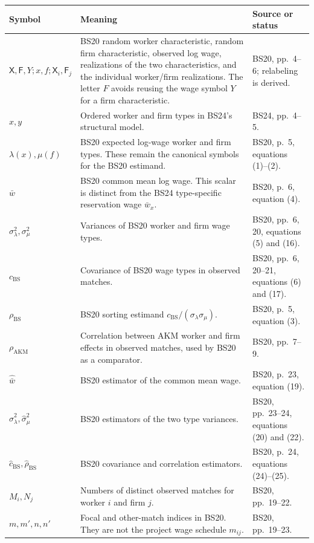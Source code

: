 \documentclass[11pt]{article}
\begin{document}
\begin{longtable}{p{}p{}p{}}
\textbf{Symbol} & \textbf{Meaning} & \textbf{Source or status} \\
\hline
\(\mathsf X,\mathsf F,Y;x,f;\mathsf X_i,\mathsf F_j\) & BS20 random worker
characteristic, random firm
characteristic, observed log wage, realizations of the two characteristics,
and the individual worker/firm realizations.  The letter \(F\) avoids reusing
the wage symbol \(Y\) for a firm characteristic. & BS20, pp.\ 4--6;
relabeling is derived. \\
\(x,y\) & Ordered worker and firm types in BS24's structural model. & BS24,
pp.\ 4--5. \\
\(\lambda(x),\mu(f)\) & BS20 expected log-wage worker and firm types.  These
remain the canonical symbols for the BS20 estimand. & BS20, p.\ 5,
equations (1)--(2). \\
\(\bar w\) & BS20 common mean log wage.  This scalar is distinct from the
BS24 type-specific reservation wage \(\bar w_x\). & BS20, p.\ 6,
equation (4). \\
\(\sigma_\lambda^2,\sigma_\mu^2\) & Variances of BS20 worker and firm wage
types. & BS20, pp.\ 6, 20, equations (5) and (16). \\
\(c_{\mathrm{BS}}\) & Covariance of BS20 wage types in observed matches. &
BS20, pp.\ 6, 20--21, equations (6) and (17). \\
\(\rho_{\mathrm{BS}}\) & BS20 sorting estimand
\(c_{\mathrm{BS}}/(\sigma_\lambda\sigma_\mu)\). & BS20, p.\ 5,
equation (3). \\
\(\rho_{\mathrm{AKM}}\) & Correlation between AKM worker and firm effects in
observed matches, used by BS20 as a comparator. & BS20, pp.\ 7--9. \\
\(\widehat{\bar w}\) & BS20 estimator of the common mean wage. & BS20,
p.\ 23, equation (19). \\
\(\widehat\sigma_\lambda^2,\widehat\sigma_\mu^2\) & BS20 estimators of the
two type variances. & BS20, pp.\ 23--24, equations (20) and (22). \\
\(\widehat c_{\mathrm{BS}},\widehat\rho_{\mathrm{BS}}\) & BS20 covariance and
correlation estimators. & BS20, p.\ 24, equations (24)--(25). \\
\(M_i,N_j\) & Numbers of distinct observed matches for worker \(i\) and firm
\(j\). & BS20, pp.\ 19--22. \\
\(m,m',n,n'\) & Focal and other-match indices in BS20.  They are not the
project wage schedule \(m_{ij}\). & BS20, pp.\ 19--23. \\

\end{longtable}
\end{document}
